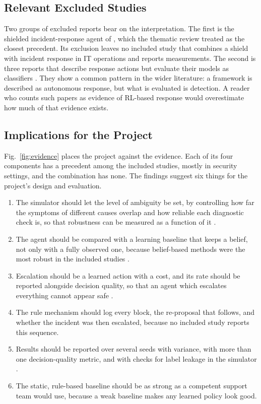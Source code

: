 \documentclass[pdflatex,sn-basic]{sn-jnl}
\begin{document}
\subsection{Relevant Excluded Studies}

Two groups of excluded reports bear on the interpretation. The first is the shielded incident-response agent of \citet{alauthman2026}, which the thematic review treated as the closest precedent. Its exclusion leaves no included study that combines a shield with incident response in IT operations and reports measurements. The second is three reports that describe response actions but evaluate their models as classifiers \citep{manojkumar2026,bompally2026,reddyavula2026}. They show a common pattern in the wider literature: a framework is described as autonomous response, but what is evaluated is detection. A reader who counts such papers as evidence of RL-based response would overestimate how much of that evidence exists.

\subsection{Implications for the Project}

Fig.~\ref{fig:evidence} places the project against the evidence. Each of its four components has a precedent among the included studies, mostly in security settings, and the combination has none. The findings suggest six things for the project's design and evaluation.

\begin{enumerate}
\item The simulator should let the level of ambiguity be set, by controlling how far the symptoms of different causes overlap and how reliable each diagnostic check is, so that robustness can be measured as a function of it \citep{sahin2026,contractor2025}.
\item The agent should be compared with a learning baseline that keeps a belief, not only with a fully observed one, because belief-based methods were the most robust in the included studies \citep{hammar2025,hammar2026belief}.
\item Escalation should be a learned action with a cost, and its rate should be reported alongside decision quality, so that an agent which escalates everything cannot appear safe \citep{kovtun2026,turan2026}.
\item The rule mechanism should log every block, the re-proposal that follows, and whether the incident was then escalated, because no included study reports this sequence.
\item Results should be reported over several seeds with variance, with more than one decision-quality metric, and with checks for label leakage in the simulator \citep{okafor2026,sahin2026}.
\item The static, rule-based baseline should be as strong as a competent support team would use, because a weak baseline makes any learned policy look good.
\end{enumerate}
\end{document}
